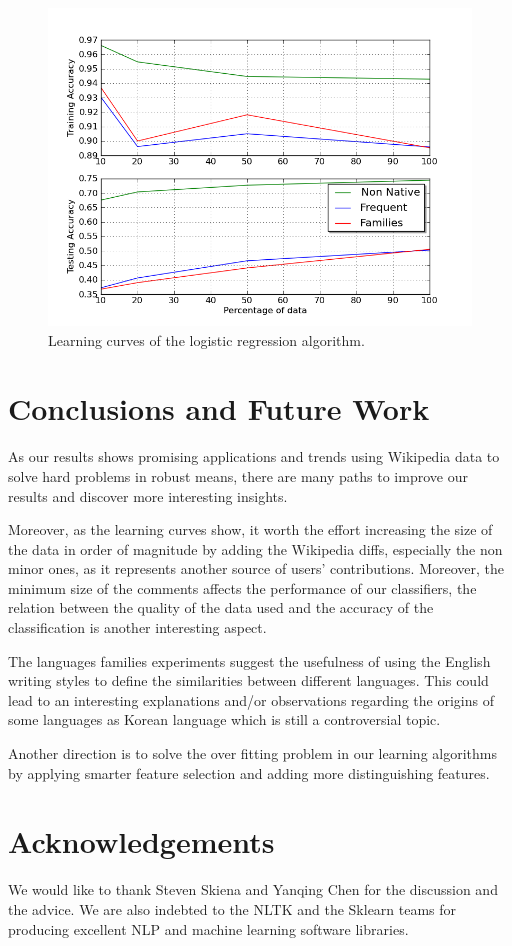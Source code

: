 \documentclass[10pt,a5paper,twoside]{article}
\begin{document}
\begin{figure}[t]
\centering
\includegraphics[scale=0.45]{combined_lc.png}
\caption{Learning curves of the logistic regression algorithm.}
\label{comb_lc}
\end{figure}


\section*{Conclusions and Future Work}
\label{conc}
As our results shows promising applications and trends using Wikipedia data to solve hard problems in robust means, there are many paths to improve our results and discover more interesting insights.

Moreover, as the learning curves show, it worth the effort increasing the size
of the data in order of magnitude by adding the Wikipedia diffs, especially the
non minor ones, as it represents another source of users' contributions. Moreover, the minimum size of the comments affects the performance of our classifiers, the relation between the quality of the data used and the accuracy of the classification is another interesting aspect.

The languages families experiments suggest the usefulness of using the English
writing styles to define the similarities between different languages. This
could lead to an interesting explanations and/or observations regarding the
origins of some languages as Korean language which is still a controversial topic.

Another direction is to solve the over fitting problem in our learning algorithms by applying smarter feature selection and adding more distinguishing features.

\section*{Acknowledgements}
We would like to thank Steven Skiena and Yanqing Chen for the discussion and the advice.
We are also indebted to the NLTK and the Sklearn teams for producing excellent
NLP and machine learning software libraries.

{}

\end{document}
